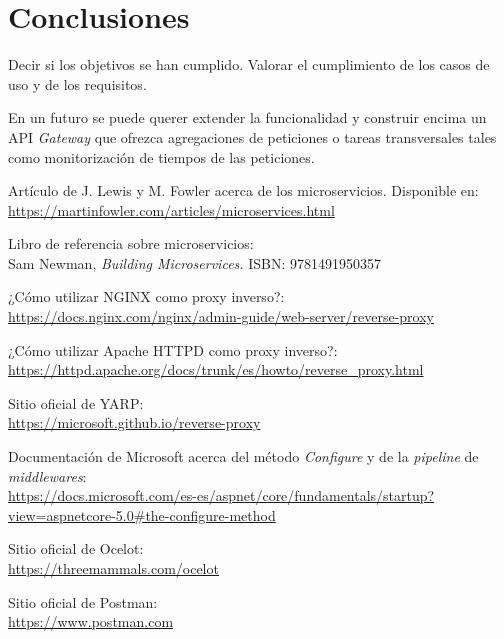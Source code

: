 \documentclass[11pt,spanish,listoffigures]{tfgetsinf}
\begin{document}

\chapter{Conclusiones}

Decir si los objetivos se han cumplido. Valorar el cumplimiento de los casos de uso y de los requisitos.

En un futuro se puede querer extender la funcionalidad y construir encima un API \emph{Gateway} que ofrezca agregaciones de peticiones o tareas transversales tales como monitorización de tiempos de las peticiones.


\begin{thebibliography}{10}

Artículo de J. Lewis y M. Fowler acerca de los microservicios.
\newblock Disponible en:\\
\url{https://martinfowler.com/articles/microservices.html}

Libro de referencia sobre microservicios:\\
\newblock Sam Newman,
\newblock \emph{Building Microservices.}
\newblock ISBN: 9781491950357

¿Cómo utilizar NGINX como proxy inverso?:\\
\url{https://docs.nginx.com/nginx/admin-guide/web-server/reverse-proxy}

¿Cómo utilizar Apache HTTPD como proxy inverso?:\\
\url{https://httpd.apache.org/docs/trunk/es/howto/reverse_proxy.html}

Sitio oficial de YARP:\\
\url{https://microsoft.github.io/reverse-proxy}

Documentación de Microsoft acerca del método \emph{Configure} y de la \emph{pipeline} de \emph{middlewares}:\\
\url{https://docs.microsoft.com/es-es/aspnet/core/fundamentals/startup?view=aspnetcore-5.0#the-configure-method}

Sitio oficial de Ocelot:\\
\url{https://threemammals.com/ocelot}

Sitio oficial de Postman:\\
\url{https://www.postman.com}


\end{thebibliography}
\end{document}

